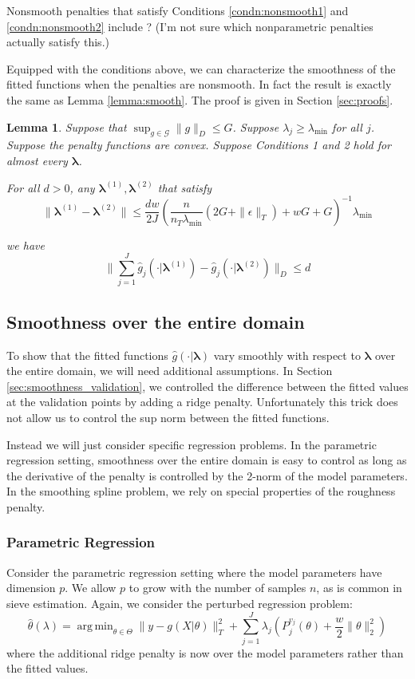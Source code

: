 \documentclass[12pt]{article}
\newtheorem{lemma}{Lemma}
\DeclareMathOperator*{\argmin}{arg\,min}
\begin{document}
Nonsmooth penalties that satisfy Conditions \ref{condn:nonsmooth1} and \ref{condn:nonsmooth2} include ? (I'm not sure which nonparametric penalties actually satisfy this.)

Equipped with the conditions above, we can characterize the smoothness of the fitted functions when the penalties are nonsmooth. In fact the result is exactly the same as Lemma \ref{lemma:smooth}. The proof is given in Section \ref{sec:proofs}.

\begin{lemma}
\label{lemma:nonsmooth}
Suppose that $\sup_{g\in\mathcal{G}}\|g\|_{D}\le G$.
Suppose $\lambda_j \ge \lambda_{\min}$ for all $j$.
Suppose the penalty functions are convex.
Suppose Conditions 1 and 2 hold for almost every $\boldsymbol{\lambda}$.

For all $d>0$, any $\boldsymbol \lambda^{(1)}, \boldsymbol \lambda^{(2)}$ that satisfy
\[
\|\boldsymbol \lambda^{(1)}- \boldsymbol \lambda^{(2)}\|\le\frac{dw}{2J}\left(\frac{n}{n_T \lambda_{\min} }\left(2G+\|\epsilon\|_{T}\right)+wG+G\right)^{-1}\lambda_{\min}
\]

we have
\[
\|\sum_{j=1}^{J}\hat{g}_{j}(\cdot| \boldsymbol \lambda^{(1)})-\hat{g}_{j}(\cdot| \boldsymbol \lambda^{(2)})\|_{D}\le d
\]
\end{lemma}

\subsection{Smoothness over the entire domain}
\label{sec:smoothness_domain}

To show that the fitted functions $\hat{g}(\cdot | \boldsymbol \lambda)$ vary smoothly with respect to $\boldsymbol \lambda$ over the entire domain, we will need additional assumptions. In Section \ref{sec:smoothness_validation}, we controlled the difference between the fitted values at the validation points by adding a ridge penalty. Unfortunately this trick does not allow us to control the sup norm between the fitted functions.

Instead we will just consider specific regression problems. In the parametric regression setting, smoothness over the entire domain is easy to control as long as the derivative of the penalty is controlled by the 2-norm of the model parameters. In the smoothing spline problem, we rely on special properties of the roughness penalty.

\subsubsection{Parametric Regression}
Consider the parametric regression setting where the model parameters have dimension $p$. We allow $p$ to grow with the number of samples $n$, as is common in sieve estimation. Again, we consider the perturbed regression problem:
\begin{equation}
\hat{\theta}(\lambda) = \argmin_{\theta \in \Theta} \| y -  g(X| \theta) \|^2_T + \sum_{j=1}^J \lambda_j \left ( P^{v_j}_j(\theta) + \frac{w}{2} \| \theta \|^2_2 \right )
\end{equation}
where the additional ridge penalty is now over the model parameters rather than the fitted values.
\end{document}
